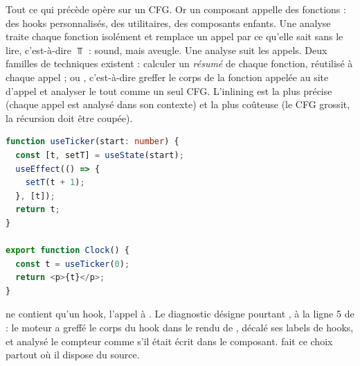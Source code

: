Tout ce qui précède opère sur un CFG. Or un composant appelle des fonctions :
des hooks personnalisés, des utilitaires, des composants enfants. Une analyse
 traite chaque fonction isolément et remplace un
appel par ce qu'elle sait sans le lire, c'est-à-dire $\Top$ : sound, mais
aveugle. Une analyse  suit les appels. Deux familles
de techniques existent : calculer un \emph{résumé} de chaque fonction,
réutilisé à chaque appel ; ou , c'est-à-dire greffer le corps
de la fonction appelée au site d'appel et analyser le tout comme un seul CFG.
L'inlining est la plus précise (chaque appel est analysé dans son contexte)
et la plus coûteuse (le CFG grossit, la récursion doit être coupée).

\begin{lstlisting}[language=TypeScript,caption={Un hook personnalisé qui boucle (\file{/tmp/ch03/custom.tsx}, élagué de sa ligne d'import)},label={lst:interpretation-abstraite-custom}]
function useTicker(start: number) {
  const [t, setT] = useState(start);
  useEffect(() => {
    setT(t + 1);
  }, [t]);
  return t;
}

export function Clock() {
  const t = useTicker(0);
  return <p>{t}</p>;
}
\end{lstlisting}


 ne contient qu'un hook, l'appel à . Le
diagnostic désigne pourtant \code{[hook:1]}, à la ligne 5 de
 : le moteur a greffé le corps du hook dans le rendu de
, décalé ses labels de hooks, et analysé le compteur comme s'il
était écrit dans le composant. \reactant{} fait ce choix partout où il
dispose du source.

